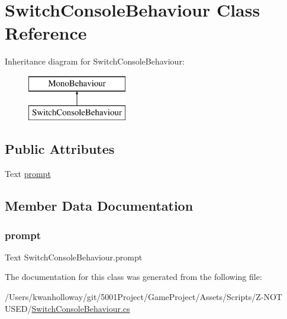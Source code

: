 \hypertarget{class_switch_console_behaviour}{}\section{Switch\+Console\+Behaviour Class Reference}
\label{class_switch_console_behaviour}
Inheritance diagram for Switch\+Console\+Behaviour\+:\begin{figure}[H]
\begin{center}
\leavevmode
\includegraphics[height=2.000000cm]{class_switch_console_behaviour}
\end{center}
\end{figure}
\subsection*{Public Attributes}
\begin{DoxyCompactItemize}
\item 
Text \hyperlink{class_switch_console_behaviour_a9684bb7d318c4aab9a98275fd28c8ea3}{prompt}
\end{DoxyCompactItemize}


\subsection{Member Data Documentation}
\mbox{\label{class_switch_console_behaviour_a9684bb7d318c4aab9a98275fd28c8ea3}} 
\subsubsection{\texorpdfstring{prompt}{prompt}}
{\footnotesize\ttfamily Text Switch\+Console\+Behaviour.\+prompt}



The documentation for this class was generated from the following file\+:\begin{DoxyCompactItemize}
\item 
/\+Users/kwanholloway/git/5001\+Project/\+Game\+Project/\+Assets/\+Scripts/\+Z-\/\+N\+O\+T U\+S\+E\+D/\hyperlink{_switch_console_behaviour_8cs}{Switch\+Console\+Behaviour.\+cs}\end{DoxyCompactItemize}
